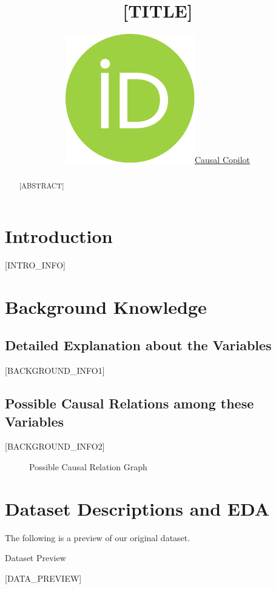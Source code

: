 \documentclass{article}
\title{[TITLE]}
\author{ \href{https://orcid.org/0000-0000-0000-0000}{\includegraphics[scale=0.06]{postprocess/context/orcid.pdf}\hspace{1mm}Causal Copilot}}
\begin{document}
\maketitle

\begin{abstract}
[ABSTRACT]
\end{abstract}


\raggedbottom
\section{Introduction}
[INTRO_INFO]

\section{Background Knowledge}
\subsection{Detailed Explanation about the Variables}
[BACKGROUND_INFO1]

\subsection{Possible Causal Relations among these Variables}

\begin{minipage}[t]{0.7\linewidth}
    [BACKGROUND_INFO2]
\vfill
\end{minipage}
\hspace{0.05\textwidth}
\begin{minipage}[t]{0.3\linewidth}
    \begin{figure}[H]
        \centering
        \vspace{-0.5cm}
        \caption{\label{fig:relation}Possible Causal Relation Graph}
    \end{figure}
\end{minipage}


\section{Dataset Descriptions and EDA}
The following is a preview of our original dataset.

\begin{table}[H]
    \centering
    \caption{Dataset Preview}
[DATA_PREVIEW]
\end{table}
\end{document}
